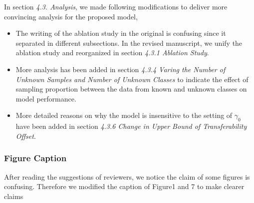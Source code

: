 In section \textit{4.3. Analysis}, we made following modifications to deliver more convincing analysis for the proposed model,
\begin{itemize}[topsep=0pt]
    \small
    \item The writing of the ablation study in the original is confusing since it separated in different subsections. In the revised manuscript, we unify the ablation study and reorganized in section \textit{4.3.1 Ablation Study}. 
    \item More analysis has been added in section \textit{4.3.4 Varing the Number of Unknown Samples and Number of Unknown Classes} to indicate the effect of sampling proportion between the data from known and unknown classes on model performance.
    \item More detailed reasons on why the model is insensitive to the setting of $\gamma_0$ have been added in section \textit{4.3.6 Change in Upper Bound of Transferability Offset}.
\end{itemize}

\subsubsection*{{\textbf{Figure Caption}}}
After reading the suggestions of reviewers, we notice the claim of some figures is confusing. 
Therefore we modified the caption of Figure1 and 7 to make clearer claims
